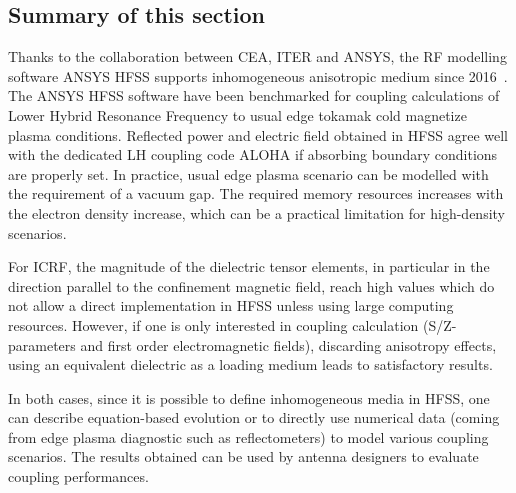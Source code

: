 
\subsection{Summary of this section}
Thanks to the collaboration between CEA, ITER and ANSYS, the RF modelling software ANSYS HFSS supports inhomogeneous anisotropic medium since 2016~. The ANSYS HFSS software have been benchmarked for coupling calculations of Lower Hybrid Resonance Frequency to usual edge tokamak cold magnetize plasma conditions. Reflected power and electric field obtained in HFSS agree well with the dedicated LH coupling code ALOHA if absorbing boundary conditions are properly set. In practice, usual edge plasma scenario can be modelled with the requirement of a vacuum gap. The  required memory resources increases with the electron density increase, which can be a practical limitation for high-density scenarios.

For ICRF, the magnitude of the dielectric tensor elements, in particular in the direction parallel to the confinement magnetic field, reach high values which do not allow a direct implementation in HFSS unless using large computing resources. However, if one is only interested in coupling calculation (S/Z-parameters and first order electromagnetic fields), discarding anisotropy effects, using an equivalent dielectric as a loading medium leads to satisfactory results. 

In both cases, since it is possible to define inhomogeneous media in HFSS, one can describe equation-based evolution or to directly use numerical data (coming from edge plasma diagnostic such as reflectometers) to model various coupling scenarios. The results obtained can be used by antenna designers to evaluate coupling performances. 


